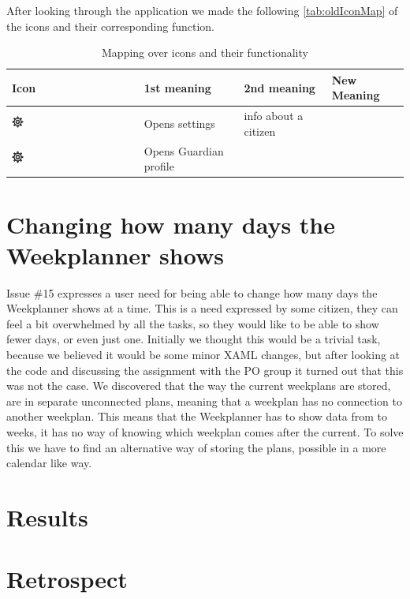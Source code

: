 After looking through the application we made the following \autoref{tab:oldIconMap} of the icons and their corresponding function.

\begin{table}[ht]
    \begin{tabular}{m{1.5cm} | m{3.5cm} | m{3.5cm} | m{3.5cm} }
        Icon & 1st meaning & 2nd meaning & New Meaning \\ \hline

        \includegraphics[width=0.1\textwidth]{figures/smallTestIcon.png} & Opens settings  & info about a citizen & \\
        \hline

        \includegraphics[width=0.1\textwidth]{figures/smallTestIcon.png} & Opens Guardian profile  &  \\
        \hline

    \end{tabular}
    \caption{Mapping over icons and their functionality}
    \label{tab:oldIconMap} 
\end{table}

\section{Changing how many days the Weekplanner shows}\label{sec:weekPlannerDaysToShow}

Issue \#15 expresses a user need for being able to change how many days the Weekplanner shows at a time. This is a need expressed by some citizen, they can feel a bit overwhelmed by all the tasks, so they would like to be able to show fewer days, or even just one.
Initially we thought this would be a trivial task, because we believed it would be some minor \gls{XAML} changes, but after looking at the code and discussing the assignment with the \gls{PO} group it turned out that this was not the case. We discovered that the way the current weekplans are stored, are in separate unconnected plans, meaning that a weekplan has no connection to another weekplan. This means that the Weekplanner has to show data from to weeks, it has no way of knowing which weekplan comes after the current.
To solve this we have to find an alternative way of storing the plans, possible in a more calendar like way.

\section{Results}

\section{Retrospect}